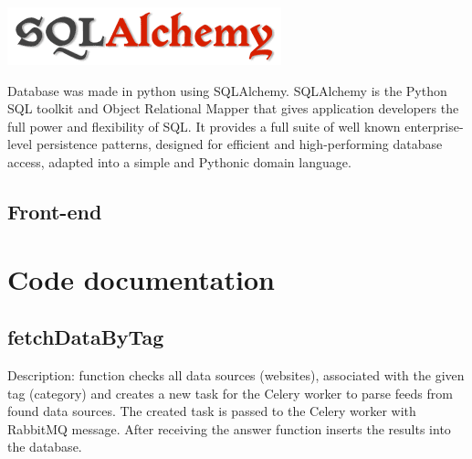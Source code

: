 \documentclass[12pt]{article}
\begin{document}
\includegraphics{images/sqla.png}

Database was made in python using SQLAlchemy. SQLAlchemy is the Python SQL toolkit and Object Relational Mapper that gives application developers the full power and flexibility of SQL. It provides a full suite of well known enterprise-level persistence patterns, designed for efficient and high-performing database access, adapted into a simple and Pythonic domain language.




\subsection{Front-end}

\section{Code documentation}


\subsection{fetchDataByTag}
Description: function checks all data sources (websites), associated with the given tag (category) and creates a new task for the Celery worker to parse feeds from found data sources. The created task is passed to the Celery worker with RabbitMQ message. After receiving the answer function inserts the results into the database.
\end{document}
